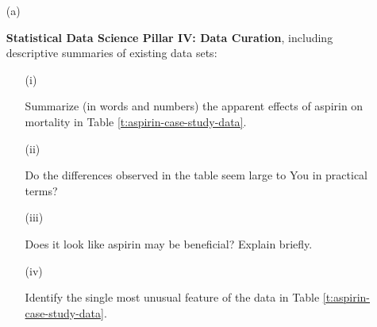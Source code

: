 \documentclass[12pt]{article}
\renewcommand{\b}[1]{\textbf{#1}}
\begin{document}
\begin{itemize}

\item[(a)]

\textit{} \vspace*{0.025in} \b{Statistical Data Science Pillar IV: Data Curation}, including descriptive summaries of existing data sets:

\begin{itemize}

\item[(i)]

Summarize (in words and numbers) the apparent effects of aspirin on mortality in Table \ref{t:aspirin-case-study-data}. \fbox{\textbf{\textit{[10 points]}}} 

\item[(ii)]

Do the differences observed in the table seem large to You in practical terms? \\ \fbox{\textbf{\textit{[10 points]}}} 

\item[(iii)]

Does it look like aspirin may be beneficial? Explain briefly. \fbox{\textbf{\textit{[10 points]}}}

\item[(iv)]

Identify the single most unusual feature of the data in Table \ref{t:aspirin-case-study-data}. \fbox{\textbf{\textit{[10 points]}}}


\end{itemize}
\end{itemize}
\end{document}
